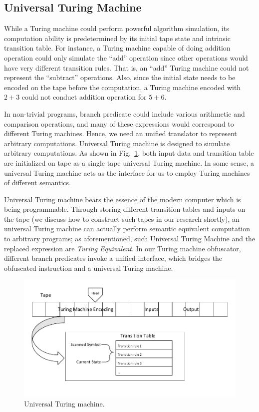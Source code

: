 \documentclass[lnicst]{svmultln}
\newcommand{\F}{Fig.}
\begin{document}
\subsection{Universal Turing Machine}
While a Turing machine could perform powerful algorithm simulation, its
computation ability is predetermined by its initial tape state and intrinsic
transition table. For instance, a Turing machine capable of doing addition
operation could only simulate the ``add'' operation since other operations would
have very different transition rules. That is, an ``add'' Turing machine could
not represent the ``subtract'' operations. Also, since the initial state needs
to be encoded on the tape before the computation, a Turing machine encoded with
$2 + 3$ could not conduct addition operation for $5 + 6$.

In non-trivial programs, branch predicate could include various arithmetic and
comparison operations, and many of these expressions would correspond to
different Turing machines. Hence, we need an unified translator to represent
arbitrary computations. Universal Turing machine is designed to simulate
arbitrary computations. As shown in \F~\ref{fig:four}, both input data and
transition table are initialized on tape as a single tape universal Turing machine. 
In some sense, a universal Turing machine acts as the
interface for us to employ Turing machines of different semantics.

Universal Turing machine bears the essence of the modern computer which is being
programmable. Through storing different transition tables and inputs on the tape
(we discuss how to construct such tapes in our research shortly), an universal
Turing machine can actually perform semantic equivalent computation to arbitrary
programs; as aforementioned, such Universal Turing Machine and the replaced
expression are \textit{Turing Equivalent}. In our Turing machine obfuscator,
different branch predicates invoke a unified interface, which bridges the
obfuscated instruction and a universal Turing machine.

\begin{figure}
 \includegraphics[width=\linewidth]{UTM.pdf}
 \caption{Universal Turing machine.}
 \label{fig:four}
\end{figure}
\end{document}
